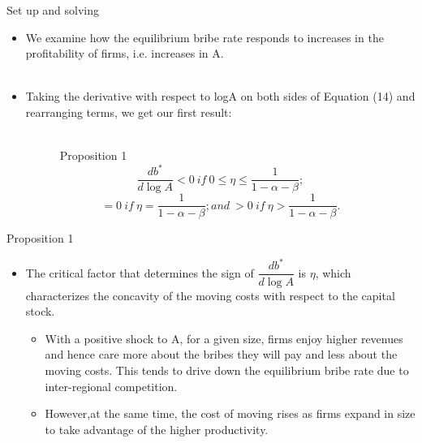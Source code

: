 \documentclass{beamer}
\begin{document}
\begin{frame}{Set up and solving}

\begin{itemize}
\item We examine how the equilibrium bribe rate responds to increases in the profitability of firms, i.e. increases in A. \\~
\item Taking the derivative with respect to logA on both sides of Equation (14) and rearranging terms, we get our first result: \\~

\begin{block}{\ \ \ \ \ \ Proposition 1}
$$
\frac{db^*}{d\log A}<0\ if\ 0\le \eta \le \frac{1}{1-\alpha -\beta}; 
$$
$$
=0\ if\ \eta =\frac{1}{1-\alpha -\beta};and\ >0\ if\ \eta >\frac{1}{1-\alpha -\beta}.
$$
\end{block}

\end{itemize}

\end{frame}

\begin{frame}{Proposition 1}

\begin{itemize}
\item The critical factor that determines the sign of $\dfrac{db^*}{d\log A}$ is $\eta$, which characterizes
the concavity of the moving costs with respect to the capital stock.
\begin{itemize}
\item With a positive shock to A, for a given size, firms enjoy higher revenues and hence care more about the bribes they will pay and less about the moving costs. This tends to drive down the equilibrium bribe rate due to inter-regional competition.
\item However,at the same time, the cost of moving rises as firms expand in size to take advantage of the higher productivity.
\end{itemize}

\end{itemize}

\end{frame}
\end{document}
